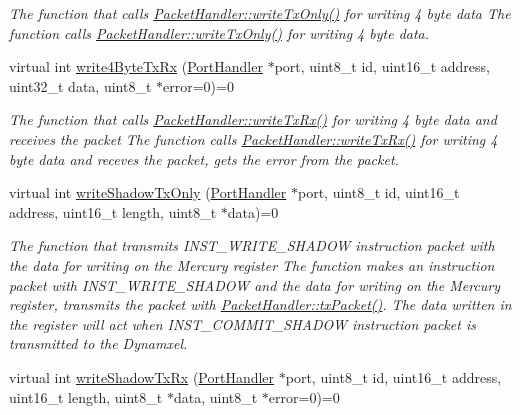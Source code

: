 \begin{DoxyCompactItemize}
\begin{DoxyCompactList}\small\item\em The function that calls \hyperlink{classmercury_1_1_packet_handler_acf4e01987186250221603f794e7e4b59}{Packet\+Handler\+::write\+Tx\+Only()} for writing 4 byte data  The function calls \hyperlink{classmercury_1_1_packet_handler_acf4e01987186250221603f794e7e4b59}{Packet\+Handler\+::write\+Tx\+Only()} for writing 4 byte data. \end{DoxyCompactList}\item 
virtual int \hyperlink{classmercury_1_1_packet_handler_acd4df6583fcbaf872a4aba6623c9b084}{write4\+Byte\+Tx\+Rx} (\hyperlink{classmercury_1_1_port_handler}{Port\+Handler} $\ast$port, uint8\+\_\+t id, uint16\+\_\+t address, uint32\+\_\+t data, uint8\+\_\+t $\ast$error=0)=0
\begin{DoxyCompactList}\small\item\em The function that calls \hyperlink{classmercury_1_1_packet_handler_adf35a5000d465bd5426530e34a91a21d}{Packet\+Handler\+::write\+Tx\+Rx()} for writing 4 byte data and receives the packet  The function calls \hyperlink{classmercury_1_1_packet_handler_adf35a5000d465bd5426530e34a91a21d}{Packet\+Handler\+::write\+Tx\+Rx()} for writing 4 byte data and receves the packet,  gets the error from the packet. \end{DoxyCompactList}\item 
virtual int \hyperlink{classmercury_1_1_packet_handler_a1f0bf77b7d230076624b428664bbf678}{write\+Shadow\+Tx\+Only} (\hyperlink{classmercury_1_1_port_handler}{Port\+Handler} $\ast$port, uint8\+\_\+t id, uint16\+\_\+t address, uint16\+\_\+t length, uint8\+\_\+t $\ast$data)=0
\begin{DoxyCompactList}\small\item\em The function that transmits I\+N\+S\+T\+\_\+\+W\+R\+I\+T\+E\+\_\+\+S\+H\+A\+D\+OW instruction packet with the data for writing on the Mercury register  The function makes an instruction packet with I\+N\+S\+T\+\_\+\+W\+R\+I\+T\+E\+\_\+\+S\+H\+A\+D\+OW and the data for writing on the Mercury register,  transmits the packet with \hyperlink{classmercury_1_1_packet_handler_acc3f84f0d952dc2d827d8500de512abe}{Packet\+Handler\+::tx\+Packet()}.  The data written in the register will act when I\+N\+S\+T\+\_\+\+C\+O\+M\+M\+I\+T\+\_\+\+S\+H\+A\+D\+OW instruction packet is transmitted to the Dynamxel. \end{DoxyCompactList}\item 
virtual int \hyperlink{classmercury_1_1_packet_handler_a5f81e12eabd4f661f828046ed0842727}{write\+Shadow\+Tx\+Rx} (\hyperlink{classmercury_1_1_port_handler}{Port\+Handler} $\ast$port, uint8\+\_\+t id, uint16\+\_\+t address, uint16\+\_\+t length, uint8\+\_\+t $\ast$data, uint8\+\_\+t $\ast$error=0)=0

\end{DoxyCompactItemize}

